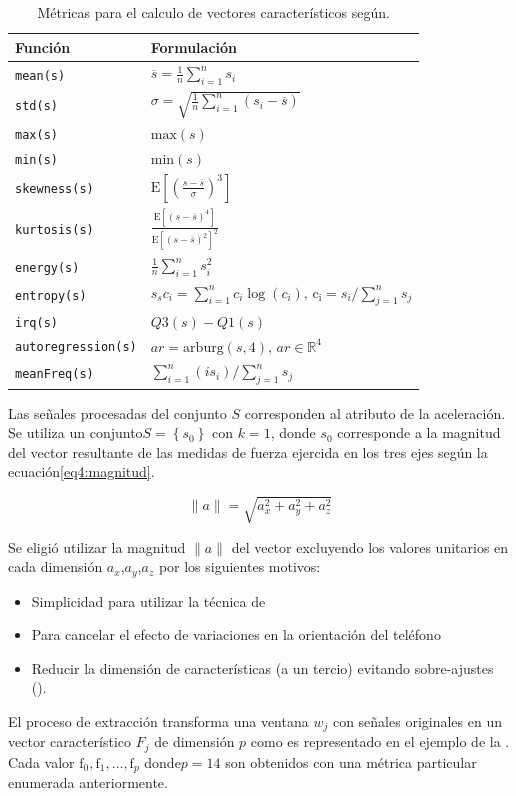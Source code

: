 \begin{table}[!tbph]
\begin{centering}
\begin{tabular}{|l|l|}
\hline 
Función & Formulación\tabularnewline
\hline 
\hline 
\texttt{mean(s)} & $\overline{s}=\frac{1}{n}\sum_{i=1}^{n}s_{i}$\tabularnewline
\hline 
\texttt{std(s)} & $\sigma=\sqrt{\frac{1}{n}\sum_{i=1}^{n}\left(s_{i}-\overline{s}\right)}$\tabularnewline
\hline 
\texttt{max(s)} & $\mathrm{max}(s)$\tabularnewline
\hline 
\texttt{min(s)} & $\mathrm{min}(s)$\tabularnewline
\hline 
\texttt{skewness(s)} & $\mathrm{E}\left[\left(\frac{s-\overline{s}}{\sigma}\right)^{3}\right]$\tabularnewline
\hline 
\texttt{kurtosis(s)} & $\frac{\mathrm{E}\left[\left(s-\overline{s}\right)^{4}\right]}{\mathrm{E}\left[\left(s-\overline{s}\right)^{2}\right]^{2}}$\tabularnewline
\hline 
\texttt{energy(s)} & $\frac{1}{n}\sum_{i=1}^{n}s_{i}^{2}$\tabularnewline
\hline 
\texttt{entropy(s)} & $s_{s}c_{i}=\sum_{i=1}^{n}c_{i}\log\left(c_{i}\right)\mathrm{\mathtt{\mathrm{,}}\,c_{i}}=s_{i}/\sum_{j=1}^{n}s_{j}$\tabularnewline
\hline 
\texttt{irq(s)} & $Q3(s)-Q1(s)$\tabularnewline
\hline 
\texttt{autoregression(s)} & $ar=\mathrm{arburg}\left(s,4\right)\mathrm{,}\,ar\in\mathbb{R}^{4}$\tabularnewline
\hline 
\texttt{meanFreq(s)} & $\sum_{i=1}^{n}\left(is_{i}\right)/\sum_{j=1}^{n}s_{j}$\tabularnewline
\hline 
\end{tabular}
\par\end{centering}
\caption[Métricas de valores característicos]{\label{tab4:metricas}Métricas para el calculo de vectores característicos
según\cite{ReyesOrtiz2015}.}
\end{table}

Las señales procesadas del conjunto $S$ corresponden al atributo
de la aceleración. Se utiliza un conjunto$S=\left\{ s_{0}\right\} $
con $k=1$, donde $s_{0}$ corresponde a la magnitud del vector resultante
de las medidas de fuerza ejercida en los tres ejes según la ecuación\ref{eq4:magnitud}.

\begin{equation}
\lVert a\rVert=\sqrt{a_{x}^{2}+a_{y}^{2}+a_{z}^{2}}\label{eq4:magnitud}
\end{equation}

Se eligió utilizar la magnitud $\lVert a\rVert$ del vector excluyendo
los valores unitarios en cada dimensión $a_{x}$,$a_{y}$,$a_{z}$
por los siguientes motivos:
\begin{itemize}
\item Simplicidad para utilizar la técnica de 
\item Para cancelar el efecto de variaciones en la orientación del teléfono\cite{Schneider2014}
\item Reducir la dimensión de características (a un tercio) evitando sobre-ajustes
().
\end{itemize}
El proceso de extracción transforma una ventana $w_{j}$ con señales
originales en un vector característico $F_{j}$ de dimensión $p$
como es representado en el ejemplo de la .
Cada valor $\mathrm{f}_{0},\mathrm{f}_{1},\ldots,\mathrm{f}_{p}$
donde$p=14$ son obtenidos con una métrica particular enumerada anteriormente.

